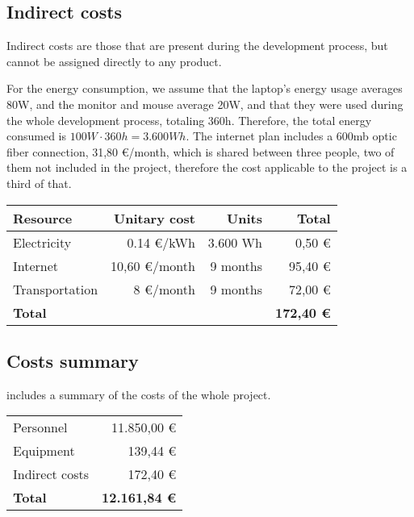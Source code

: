 \subsection{Indirect costs}
Indirect costs are those that are present during the development process, but cannot be assigned directly to any product.

For the energy consumption, we assume that the laptop's energy usage averages 80W, and the monitor and mouse average 20W, and that they were used during the whole development process, totaling 360h. Therefore, the total energy consumed is $100W \cdot 360 h = 3.600 Wh$. The internet plan includes a 600mb optic fiber connection, 31,80 €/month, which is shared between three people, two of them not included in the project, therefore the cost applicable to the project is a third of that.


\begin{table}[htb]
    {
      \begin{tabular}{lrrr}
        \toprule
        \textbf{Resource} & \textbf{Unitary cost} & \textbf{Units} & \textbf{Total} \\
        \midrule
        Electricity    &     0.14 €/kWh & 3.600 Wh &  0,50 € \\
        Internet       &  10,60 €/month & 9 months & 95,40 € \\
        Transportation &      8 €/month & 9 months & 72,00 € \\
        \midrule
        \textbf{Total} & & & \textbf{172,40 €} \\
        \bottomrule
      \end{tabular}
    }
\end{table}


\subsection{Costs summary}\label{subsec:cost-summary}
 includes a summary of the costs of the whole project.

\begin{table}[htb]
    {
      \begin{tabular}{p{5cm}r}
        \toprule
        Personnel          & 11.850,00 € \\
        Equipment          &    139,44 € \\
        Indirect costs     &    172,40 € \\
        \midrule
        \textbf{Total}     & \textbf{12.161,84 €} \\
        \bottomrule
      \end{tabular}
    }
\end{table}

